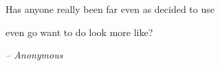 \leavevmode
\vfill 
\begin{flushright}
	Has anyone really been far even as decided to use 
	
	even go want to do look more like? 
	
	\textit{-- Anonymous}
\end{flushright}
\vfill
